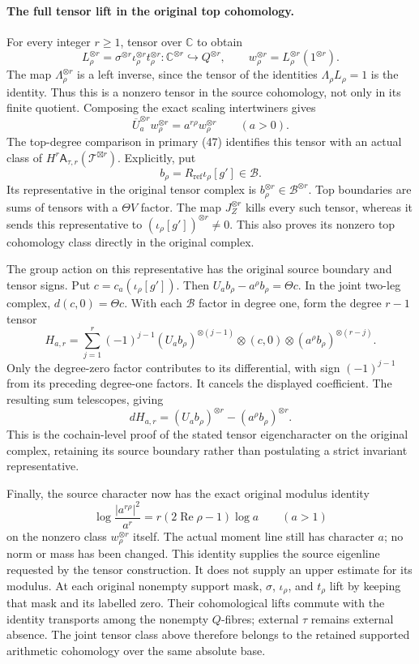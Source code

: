 \documentclass[10pt,a4paper,oneside]{report}
\begin{document}
\paragraph{The full tensor lift in the original top cohomology.}
For every integer \(r\geq1\), tensor over \(\mathbb C\) to obtain
\[
 L_\rho^{\otimes r}
 =\sigma^{\otimes r}\iota_\rho^{\otimes r}t_\rho^{\otimes r}:
 \mathbb C^{\otimes r}\hookrightarrow Q^{\otimes r},
 \qquad w_\rho^{\otimes r}=L_\rho^{\otimes r}(1^{\otimes r}).
\]
The map \(\Lambda_\rho^{\otimes r}\) is a left inverse, since the
tensor of the identities \(\Lambda_\rho L_\rho=1\) is the identity.
Thus this is a nonzero tensor in the source cohomology, not only in its
finite quotient. Composing the exact scaling intertwiners gives
\[
 \overline U_a^{\otimes r}w_\rho^{\otimes r}
 =a^{r\rho}w_\rho^{\otimes r}\qquad(a>0).
\]
The top-degree comparison in primary (47) identifies this tensor with
an actual class of
\(H^r\mathsf A_{\tau,r}(\mathcal T^{\boxtimes r})\).
Explicitly, put
\[
 b_\rho=R_{\mathrm{ref}}\iota_\rho[g']\in\mathscr B.
\]
Its representative in the original tensor complex is
\(b_\rho^{\otimes r}\in\mathscr B^{\otimes r}\). Top boundaries are
sums of tensors with a \(\Theta V\) factor. The map
\(J_Z^{\otimes r}\) kills every such tensor, whereas it sends this
representative to \((\iota_\rho[g'])^{\otimes r}\ne0\). This also
proves its nonzero top cohomology class directly in the original
complex.

The group action on this representative has the original source
boundary and tensor signs. Put
\(c=c_a(\iota_\rho[g'])\). Then
\(U_ab_\rho-a^\rho b_\rho=\Theta c\). In the joint two-leg complex,
\(d(c,0)=\Theta c\). With each \(\mathscr B\) factor in degree one,
form the degree \(r-1\) tensor
\[
 H_{a,r}=\sum_{j=1}^{r}(-1)^{j-1}
 (U_ab_\rho)^{\otimes(j-1)}\otimes(c,0)
 \otimes(a^\rho b_\rho)^{\otimes(r-j)}.
\]
Only the degree-zero factor contributes to its differential, with
sign \((-1)^{j-1}\) from its preceding degree-one factors. It cancels
the displayed coefficient. The resulting sum telescopes, giving
\[
 dH_{a,r}=(U_ab_\rho)^{\otimes r}
             -(a^\rho b_\rho)^{\otimes r}.
\]
This is the cochain-level proof of the stated tensor eigencharacter
on the original complex, retaining its source boundary rather than
postulating a strict invariant representative.

Finally, the source character now has the exact original modulus
identity
\[
 \log\frac{|a^{r\rho}|^2}{a^r}
 =r(2\operatorname{Re}\rho-1)\log a\qquad(a>1)
\]
on the nonzero class \(w_\rho^{\otimes r}\) itself. The actual moment
line still has character \(a\); no norm or mass has been changed.
This identity supplies the source eigenline requested by the tensor
construction. It does not supply an upper estimate for its modulus.
At each original nonempty support mask, \(\sigma\), \(\iota_\rho\),
and \(t_\rho\) lift by keeping that mask and its labelled zero.
Their cohomological lifts commute with the identity transports among
the nonempty \(Q\)-fibres; external \(\tau\) remains external absence.
The joint tensor class above therefore belongs to the retained
supported arithmetic cohomology over the same absolute base.
\end{document}
